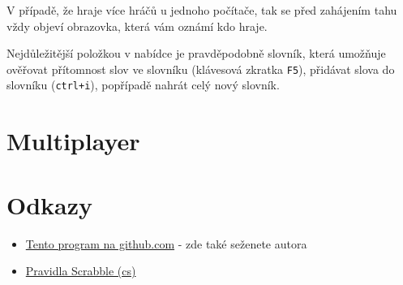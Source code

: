 \documentclass[a4paper]{article}
\begin{document}
V případě, že hraje více hráčů u jednoho počítače, tak se před zahájením tahu vždy objeví obrazovka, která vám oznámí kdo hraje.

Nejdůležitější položkou v nabídce je pravděpodobně slovník, která umožňuje ověřovat přítomnost slov ve slovníku (klávesová zkratka \texttt{F5}), přidávat slova do slovníku (\texttt{ctrl+i}), popřípadě nahrát celý nový slovník.

\section{Multiplayer}
\section{Odkazy}
\begin{itemize}
\item \href{http://github.com/Kedrigern/scrabble}{Tento program na github.com} - zde také seženete autora
\item \href{http://scrabble.hrejsi.cz/pravidla/}{Pravidla Scrabble (cs)}
\end{itemize}
\end{document}
